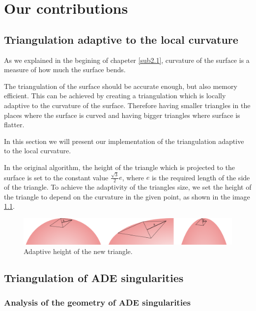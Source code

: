 \chapter{Our contributions}
\label{chap3}

\section{Triangulation adaptive to the local curvature}
\label{sub3.1}

As we explained in the begining of chapeter \ref{sub2.1}, curvature of the surface
is a measure of how much the surface bends.

The triangulation of the surface should be accurate enough, but also memory efficient.
This can be achieved by creating a triangulation which is locally adaptive to the
curvature of the surface. Therefore having smaller triangles in the places where
the surface is curved and having bigger triangles where surface is flatter.

In this section we will present our implementation of the triangulation adaptive
to the local curvature.

In the original algorithm, the height of the triangle which is projected
to the surface is set to the constant value $\frac{\sqrt{3}}{2}e$, where $e$ 
is the required length of the side of the triangle. To achieve the adaptivity
of the triangles size, we set the height of the triangle to depend on the curvature in
the given point, as shown in the image \ref{img:15}.

\begin{figure}
    \centerline{\includegraphics[width=1\textwidth]{images/img15}}
    \caption[Adaptive height of the new triangle]
    {Adaptive height of the new triangle.}
    \label{img:15}
\end{figure}

\section{Triangulation of ADE singularities}
\label{sub3.2}

\subsection*{Analysis of the geometry of ADE singularities}

